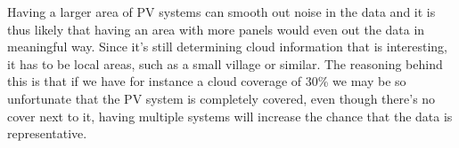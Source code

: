 
Having a larger area of PV systems can smooth out noise in the data
\citep{southafrica} and it is thus likely that having an area with
more panels would even out the data in meaningful way.  Since it's
still determining cloud information that is interesting, it has to be
local areas, such as a small village or similar.  The reasoning behind
this is that if we have for instance a cloud coverage of 30\% we may
be so unfortunate that the PV system is completely covered, even
though there's no cover next to it, having multiple systems will
increase the chance that the data is representative.

